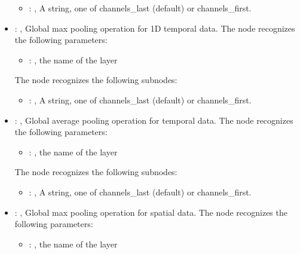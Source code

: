 \begin{itemize}
\begin{itemize}
        \item {}: , 
          A string, one of channels\_last (default) or channels\_first.
      \end{itemize}

    \item {}: , 
      Global max pooling operation for 1D temporal data.
      The  node recognizes the following parameters:
        \begin{itemize}
          \item {}: , 
            the name of the layer
      \end{itemize}

      The  node recognizes the following subnodes:
      \begin{itemize}
        \item {}: , 
          A string, one of channels\_last (default) or channels\_first.
      \end{itemize}

    \item {}: , 
      Global average pooling operation for temporal data.
      The  node recognizes the following parameters:
        \begin{itemize}
          \item {}: , 
            the name of the layer
      \end{itemize}

      The  node recognizes the following subnodes:
      \begin{itemize}
        \item {}: , 
          A string, one of channels\_last (default) or channels\_first.
      \end{itemize}

    \item {}: , 
      Global max pooling operation for spatial data.
      The  node recognizes the following parameters:
        \begin{itemize}
          \item {}: , 
            the name of the layer
      \end{itemize}


\end{itemize}
